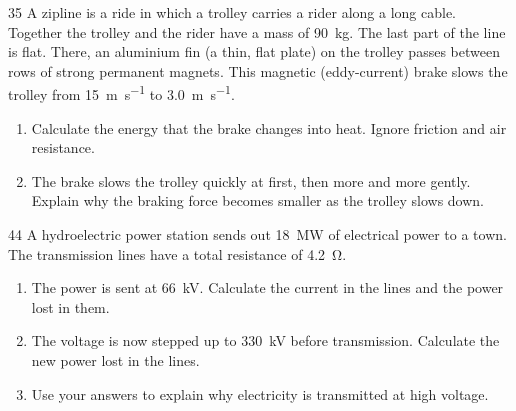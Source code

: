 \begin{practiceq}{3}{5}\label{pq:zipline}
A zipline is a ride in which a trolley carries a rider along a long cable. Together the
trolley and the rider have a mass of \qty{90}{kg}. The last part of the line is flat. There,
an aluminium fin (a thin, flat plate) on the trolley passes between rows of strong permanent
magnets. This
magnetic (eddy-current) brake slows the trolley from \qty{15}{m.s^{-1}} to
\qty{3.0}{m.s^{-1}}.
\begin{enumerate}[label=(\alph*)]
  \item Calculate the energy that the brake changes into heat. Ignore friction and air
        resistance. 
  \item The brake slows the trolley quickly at first, then more and more gently. Explain why
        the braking force becomes smaller as the trolley slows down. 
\end{enumerate}
\end{practiceq}

\begin{practiceq}{4}{4}\label{pq:hydro}
A hydroelectric power station sends out \qty{18}{MW} of electrical power to a town. The
transmission lines have a total resistance of \qty{4.2}{\ohm}.
\begin{enumerate}[label=(\alph*)]
  \item The power is sent at \qty{66}{kV}. Calculate the current in the lines and the power
        lost in them. 
  \item The voltage is now stepped up to \qty{330}{kV} before transmission. Calculate the new
        power lost in the lines. 
  \item Use your answers to explain why electricity is transmitted at high voltage.
\end{enumerate}
\end{practiceq}

